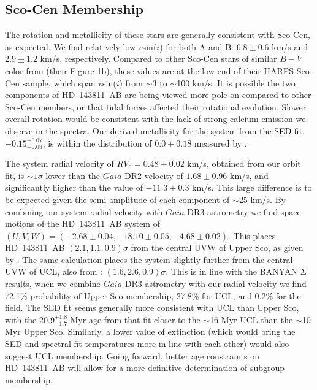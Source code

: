 \documentclass[]{aastex701} %
\begin{document}
\subsection{Sco-Cen Membership}

The rotation and metallicity of these stars are generally consistent with Sco-Cen, as expected. We find relatively low $v$sin($i$) for both A and B: $6.8 \pm 0.6$ km/s and $2.9 \pm 1.2$ km/s, respectively. Compared to other Sco-Cen stars of similar $B-V$ color from \citet{grandjean:2023} (their Figure 1b), these values are at the low end of their HARPS Sco-Cen sample, which span $v$sin($i$) from $\sim$3 to $\sim$100 km/s. It is possible the two components of HD~143811~AB are being viewed more pole-on compared to other Sco-Cen members, or that tidal forces affected their rotational evolution. Slower overall rotation would be consistent with the lack of strong calcium emission we observe in the spectra. Our derived metallicity for the system from the \textcolor{black}{SED fit, $-0.15^{+0.07}_{-0.08}$}, is within the distribution of $0.0 \pm 0.18$ measured by \citet{grandjean:2023}.

The system radial velocity of $RV_0 = 0.48 \pm 0.02$ km/s, obtained from our orbit fit, is $\sim 1 \sigma$ lower than the $Gaia$ DR2 velocity of $1.68 \pm 0.96$ km/s, and significantly higher than the \citet{chen:2011} value of $-11.3 \pm 0.3$ km/s. This large difference is to be expected given the semi-amplitude of each component of $\sim$25 km/s. By combining our system radial velocity with $Gaia$ DR3 astrometry we find space motions of the HD~143811~AB system of $(U,V,W) = (-2.68 \pm 0.04, -18.10 \pm 0.05, -4.68 \pm 0.02)$. This places HD~143811~AB $(2.1,1.1,0.9) \sigma$ from the central UVW of Upper Sco, as given by \citet{wright:2018}. The same calculation places the system slightly further from the central UVW of UCL, also from \citet{wright:2018}: $(1.6,2.6,0.9) \sigma$. This is in line with the BANYAN $\Sigma$ results, when we combine $Gaia$ DR3 astrometry with our radial velocity we find 72.1\% probability of Upper Sco membership, 27.8\% for UCL, and 0.2\% for the field. The SED fit seems generally more consistent with UCL than Upper Sco, with the $20.9^{+1.8}_{-1.7}$ Myr age from that fit closer to the $\sim$16 Myr UCL than the $\sim$10 Myr Upper Sco. Similarly, a lower value of extinction (which would bring the SED and spectral fit temperatures more in line with each other) would also suggest UCL membership. Going forward, better age constraints on HD~143811~AB will allow for a more definitive determination of subgroup membership.
\end{document}
